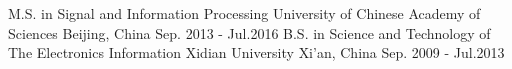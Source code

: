 

\begin{cventries}

  \cventry
    {M.S. in Signal and Information Processing} %
    {University of Chinese Academy of Sciences} %
    {Beijing, China} %
    {Sep. 2013 - Jul.2016} %
    {
    }
  \vspace{-0.8em}
  \cventry
    {B.S. in Science and Technology of The Electronics Information} %
    {Xidian University} %
    {Xi'an, China} %
    {Sep. 2009 - Jul.2013} %
    {
    }

\end{cventries}

\vspace{-0.8em}
